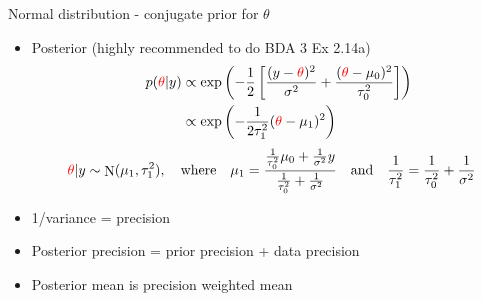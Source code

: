 \documentclass[english,t]{beamer}
\DeclareMathOperator{\N}{N}
\begin{document}
\begin{frame}{Normal distribution - conjugate prior for $\theta$}

  \begin{itemize}
  \item Posterior (highly recommended to do BDA 3 Ex 2.14a)
    \vskip -5mm
    \begin{align*}
      & &
          p({\color{red}\theta}|y)&\propto \exp\left(-\frac{1}{2}\left[
                                    \frac{(y-{\color{red}\theta})^2}{\sigma^2}+\frac{({\color{red}\theta}-\mu_0)^2}{\tau_0^2} \right]\right) \\ 
      & & & \propto \exp \left(-\frac{1}{2\tau_1^2}({\color{red}\theta}-\mu_1)^2
            \right)
    \end{align*}
    \begin{equation*}
      {\color{red}\theta}|y \sim \N(\mu_1,\tau_1^2), \quad
      \text{where} \quad
      \mu_1=\frac{\frac{1}{\tau_0^2}\mu_0+\frac{1}{\sigma^2}y}{\frac{1}{\tau_0^2}+\frac{1}{\sigma^2}} \quad  \text{and}  \quad \frac{1}{\tau_1^2} = \frac{1}{\tau_0^2}+\frac{1}{\sigma^2}
    \end{equation*}
    \vskip -2mm
    \pause
  \item 1/variance = precision
  \item Posterior precision = prior precision + data precision
  \item Posterior mean is precision weighted mean
  \end{itemize}


\end{frame}
\end{document}
